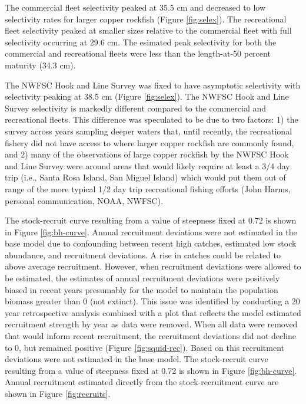\documentclass[11pt,
  english,
  a4paper,
]{article}
\begin{document}
\leavevmode\tagmcend\tagstructend\par


The commercial fleet selectivity peaked at 35.5 cm and decreased to low selectivity rates for larger copper rockfish (Figure \ref{fig:selex}). The recreational fleet selectivity peaked at smaller sizes relative to the commercial fleet with full selectivity occurring at 29.6 cm. The esimated peak selectivity for both the commercial and recreational fleets were less than the length-at-50 percent maturity (34.3 cm).

\leavevmode\tagmcend\tagstructend\par


The NWFSC Hook and Line Survey was fixed to have asymptotic selectivity with selectivity peaking at 38.5 cm (Figure \ref{fig:selex}). The NWFSC Hook and Line Survey selectivity is markedly different compared to the commercial and recreational fleets. This difference was speculated to be due to two factors: 1) the survey across years sampling deeper waters that, until recently, the recreational fishery did not have access to where larger copper rockfish are commonly found, and 2) many of the observations of large copper rockfish by the NWFSC Hook and Line Survey were around areas that would likely require at least a 3/4 day trip (i.e., Santa Rosa Island, San Miguel Island) which would put them out of range of the more typical 1/2 day trip recreational fishing efforts (John Harms, personal communication, NOAA, NWFSC).

\leavevmode\tagmcend\tagstructend\par


The stock-recruit curve resulting from a value of steepness fixed at 0.72 is shown in Figure \ref{fig:bh-curve}. Annual recruitment deviations were not estimated in the base model due to confounding between recent high catches, estimated low stock abundance, and recruitment deviations. A rise in catches could be related to above average recruitment. However, when recruitment deviations were allowed to be estimated, the estimates of annual recruitment deviations were positively biased in recent years presumably for the model to maintain the population biomass greater than 0 (not extinct). This issue was identified by conducting a 20 year retrospective analysis combined with a plot that reflects the model estimated recruitment strength by year as data were removed. When all data were removed that would inform recent recruitment, the recruitment deviations did not decline to 0, but remained positive (Figure \ref{fig:squid-rec}). Based on this recruitment deviations were not estimated in the base model. The stock-recruit curve resulting from a value of steepness fixed at 0.72 is shown in Figure \ref{fig:bh-curve}. Annual recruitment estimated directly from the stock-recruitment curve are shown in Figure \ref{fig:recruits}.
\end{document}
